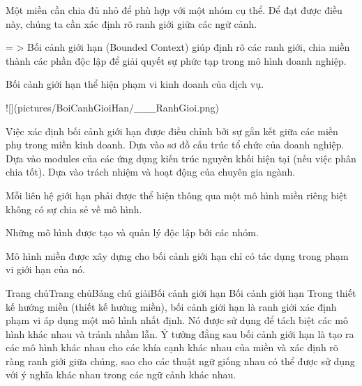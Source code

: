 
Một miền cần chia đủ nhỏ để phù hợp với một nhóm cụ thể. Để đạt được điều này, chúng ta cần xác định rõ ranh giới giữa các ngữ cảnh.

= > Bối cảnh giới hạn (Bounded Context) giúp định rõ các ranh giới, chia miền thành các phần độc lập để giải quyết sự phức tạp trong mô hình doanh nghiệp.

Bối cảnh giới hạn thể hiện phạm vi kinh doanh của dịch vụ.

![](pictures/BoiCanhGioiHan/___RanhGioi.png)


Việc xác định bối cảnh giới hạn được điều chỉnh bởi sự gắn kết giữa các miền phụ trong miền kinh doanh.
Dựa vào sơ đồ cấu trúc tổ chức của doanh nghiệp.
Dựa vào modules của các ứng dụng kiến trúc nguyên khối hiện tại (nếu việc phân chia tốt).
Dựa vào trách nhiệm và hoạt động của chuyên gia ngành.


Mỗi liên hệ giới hạn phải được thể hiện thông qua một mô hình miền riêng biệt không có sự chia sẻ về mô hình.


Những mô hình được tạo và quản lý độc lập bởi các nhóm.


Mô hình miền được xây dựng cho bối cảnh giới hạn chỉ có tác dụng trong phạm vi giới hạn của nó.



Trang chủTrang chủBảng chú giảiBối cảnh giới hạn
Bối cảnh giới hạn
Trong thiết kế hướng miền (thiết kế hướng miền), bối cảnh giới hạn là ranh giới xác định phạm vi áp dụng một mô hình nhất định. Nó được sử dụng để tách biệt các mô hình khác nhau và tránh nhầm lẫn. Ý tưởng đằng sau bối cảnh giới hạn là tạo ra các mô hình khác nhau cho các khía cạnh khác nhau của miền và xác định rõ ràng ranh giới giữa chúng, sao cho các thuật ngữ giống nhau có thể được sử dụng với ý nghĩa khác nhau trong các ngữ cảnh khác nhau.

